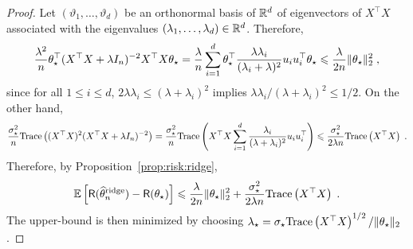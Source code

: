 \begin{proposition}

\end{proposition}
\begin{proof}
Let $(\vartheta_1,\ldots,\vartheta_d)$ be an orthonormal basis of $\mathbb{R}^d$ of eigenvectors of $X^\top X$ associated with the eigenvalues $(\lambda_1,\ldots,\lambda_d)\in\mathbb{R}^d$. Therefore,
$$
\frac{\lambda^2}{n}\theta_\star^\top(X^\top X + \lambda I_n)^{-2} X^\top X \theta_\star = \frac{\lambda}{n}\sum_{i=1}^d \theta_\star^\top \frac{\lambda \lambda_i}{(\lambda_i + \lambda)^2} u_iu_i^\top \theta_\star \leqslant  \frac{\lambda}{2n}\|\theta_\star\|_2^2\;,
$$
since for all $1\leqslant i \leqslant d$, $2\lambda \lambda_i \leqslant (\lambda + \lambda_i)^2$ implies $\lambda \lambda_i/(\lambda + \lambda_i)^2 \leqslant 1/2$. On the other hand,
$$
\frac{\sigma_\star^{2}}{n}\mathrm{Trace}\left((X^\top X)^2(X^\top X + \lambda I_n)^{-2}\right) = \frac{\sigma_\star^{2}}{n}\mathrm{Trace}\left(X^\top X\sum_{i=1}^d\frac{\lambda_i}{(\lambda + \lambda_i)^2}u_iu_i^\top\right) \leqslant \frac{\sigma_\star^{2}}{2\lambda n}\mathrm{Trace}\left(X^\top X\right) \;.
$$
Therefore, by Proposition~\ref{prop:risk:ridge},
$$
\mathbb{E}\left[\mathsf{R}(\widehat {\theta}^{\mathrm{ridge}}_n) - \mathsf{R}(\theta_\star)\right]  \leqslant \frac{\lambda}{2n}\|\theta_\star\|_2^2 + \frac{\sigma_\star^{2}}{2\lambda n}\mathrm{Trace}\left(X^\top X\right)\;.
$$
The upper-bound is then minimized by choosing $\lambda_\star = \sigma_\star \mathrm{Trace}\left(X^\top X\right)^{1/2} /\|\theta_\star\|_2 $.
\end{proof}


